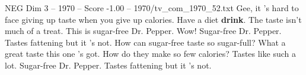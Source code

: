 \begin{textsample}{NEG Dim 3 – 1970 – Score -1.00 – 1970/tv\_com\_1970\_52.txt}  \label{ex:f3_neg_065}
Gee, it 's hard to face giving up taste when you give up calories.
Have a diet \textbf{drink}.
The taste isn't much of a treat.
This is sugar-free Dr.
Pepper.
Wow!
Sugar-free Dr.
Pepper.
Tastes fattening but it 's not.
How can sugar-free taste so sugar-full?
What a great taste this one 's got.
How do they make so few calories?
Tastes like such a lot.
Sugar-free Dr.
Pepper.
Tastes fattening but it 's not.

\end{textsample}
